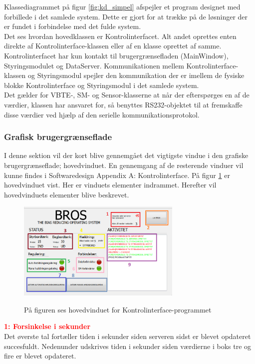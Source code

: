 Klassediagrammet på figur \ref{fig:kd_simpel} afspejler et program designet med forbillede i det samlede system. Dette er gjort for at trække på de løsninger der er fundet i forbindelse med det fulde system. \\
Det ses hvordan hovedklassen er Kontrolinterfacet. Alt andet oprettes enten direkte af Kontrolinterface-klassen eller af en klasse oprettet af samme. Kontrolinterfacet har kun kontakt til brugergrænsefladen (MainWindow), Styringsmodulet og DataServer. Kommunikationen mellem Kontrolinterface-klassen og Styringsmodul spejler den kommunikation der er imellem de fysiske blokke Kontrolinterface og Styringsmodul i det samlede system.\\

Det gælder for VBTE-, SM- og Sensor-klasserne at når der efterspørges en af de værdier, klassen har ansvaret for, så benyttes RS232-objektet til at fremskaffe disse værdier ved hjælp af den serielle kommunikationsprotokol. 


\subsubsection{Grafisk brugergrænseflade}
I denne sektion vil der kort blive gennemgået det vigtigste vindue i den grafiske brugergrænseflade; hovedvinduet. En gennemgang af de resterende vinduer vil kunne findes i Softwaredesign Appendix A: Kontrolinterface.
På figur \ref{fig:hovedvindue} er hovedvinduet vist. Her er vinduets elementer indrammet. Herefter vil hovedvinduets elementer blive beskrevet.

\begin{figure}[H]
\centering
\includegraphics[width=0.7\textwidth]{billeder/KI/hovedvindue}
\label{fig:hovedvindue}
\caption{På figuren ses hovedvinduet for Kontrolinterface-programmet}
\end{figure}

\textcolor{red}{\textbf{1: Forsinkelse i sekunder}}\\
Det øverste tal fortæller tiden i sekunder siden serveren sidst er blevet opdateret succesfuldt.
Nedenunder udskrives tiden i sekunder siden værdierne i boks tre og fire er blevet opdateret.

